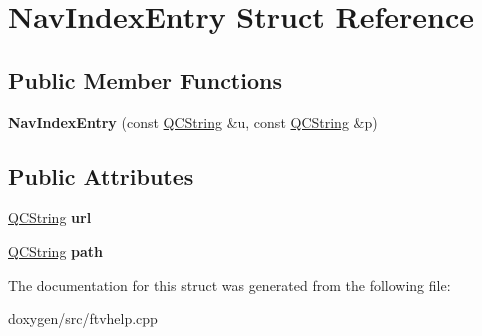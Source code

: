\hypertarget{struct_nav_index_entry}{}\section{Nav\+Index\+Entry Struct Reference}
\label{struct_nav_index_entry}
\subsection*{Public Member Functions}
\begin{DoxyCompactItemize}
\item 
\mbox{\label{struct_nav_index_entry_a6f69c51afbef38bb603552fd11cce56a}} 
{\bfseries Nav\+Index\+Entry} (const \mbox{\hyperlink{class_q_c_string}{Q\+C\+String}} \&u, const \mbox{\hyperlink{class_q_c_string}{Q\+C\+String}} \&p)
\end{DoxyCompactItemize}
\subsection*{Public Attributes}
\begin{DoxyCompactItemize}
\item 
\mbox{\label{struct_nav_index_entry_a27809e7b238b92e5aafafd1a57900111}} 
\mbox{\hyperlink{class_q_c_string}{Q\+C\+String}} {\bfseries url}
\item 
\mbox{\label{struct_nav_index_entry_a684ba0c749048aa18f5e29f8ba820d7f}} 
\mbox{\hyperlink{class_q_c_string}{Q\+C\+String}} {\bfseries path}
\end{DoxyCompactItemize}


The documentation for this struct was generated from the following file\+:\begin{DoxyCompactItemize}
\item 
doxygen/src/ftvhelp.\+cpp\end{DoxyCompactItemize}
